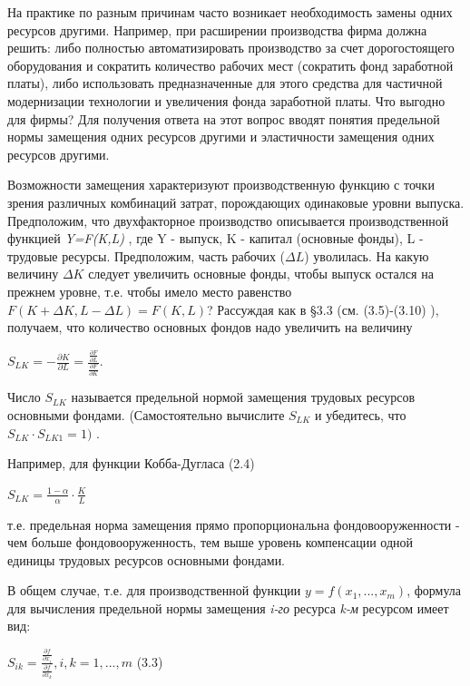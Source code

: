 \documentclass[12pt, 4paper]{book}
\begin{document}
{На практике по разным причинам часто возникает необходимость замены одних ресурсов другими. Например, при расширении производства фирма должна решить: либо полностью автоматизировать производство за счет дорогостоящего оборудования и сократить количество рабочих мест (сократить фонд заработной платы), либо использовать предназначенные для этого средства для частичной модернизации технологии и увеличения фонда заработной платы. Что выгодно для фирмы? Для получения ответа на этот вопрос вводят понятия предельной нормы замещения одних ресурсов другими и эластичности замещения одних ресурсов другими. 
\par

Возможности замещения характеризуют производственную функцию с точки зрения различных комбинаций затрат, порождающих одинаковые уровни выпуска. Предположим, что двухфакторное производство описывается производственной функцией\textit{ Y=F(K,L)} , где Y - выпуск, K - капитал (основные фонды), L - трудовые ресурсы. Предположим, часть рабочих ($\Delta L$) уволилась. На какую величину $\Delta K$ следует увеличить основные фонды, чтобы выпуск остался на прежнем уровне, т.е. чтобы имело место равенство $F(K+\Delta K,L-\Delta L)=F(K,L)$? Рассуждая как в §3.3 (см. (3.5)-(3.10) ), получаем, что количество основных фондов надо увеличить на величину 
\begin{center}
$S_{LK}=-\frac{\partial K}{\partial L}=\frac{\frac{\partial F}{\partial L}}{\frac{\partial F}{\partial K}}.$
\end{center}
\par

Число $S_{LK}$ называется предельной нормой замещения трудовых ресурсов основными фондами. (Самостоятельно вычислите $S_{LK}$ и убедитесь, что $S_{LK} \cdot S_{LK1}=1)$ . 
\par

Например, для функции Кобба-Дугласа (2.4) 
\begin{center}
$S_{LK}=\frac{1 - \alpha}{\alpha}\cdot \frac{K}{L}$
\end{center}
т.е. предельная норма замещения прямо пропорциональна фондовооруженности - чем больше фондовооруженность, тем выше уровень компенсации одной единицы трудовых ресурсов основными фондами. 
\par

В общем случае, т.е. для производственной функции $y=f(x_1,...,x_m)$, формула для вычисления предельной нормы замещения \textit{i-го} ресурса \textit{k-м} ресурсом имеет вид: 
\begin{center}
$S_{ik}=\frac{\frac{\partial f}{\partial x_i}}{\frac{\partial f}{\partial x_k}}, i,k=1,...,m$ (3.3)
\end{center}
\par

}
\end{document}
